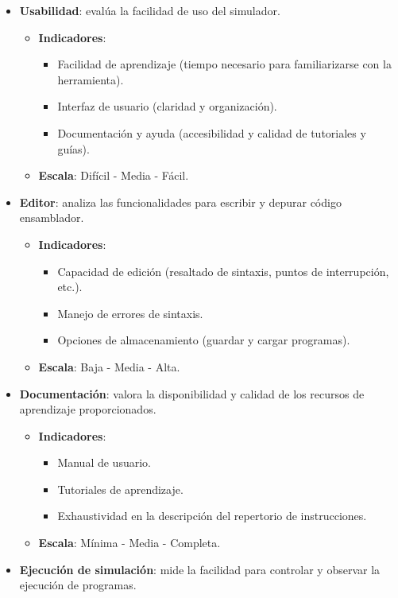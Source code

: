 \documentclass[12pt,oneside]{templates/unerthesis}
\providecommand{\tightlist}{%
  \setlength{\itemsep}{0pt}\setlength{\parskip}{0pt}}
\begin{document}
\begin{itemize}
\tightlist
\item
  \textbf{Usabilidad}: evalúa la facilidad de uso del simulador.

  \begin{itemize}
  \tightlist
  \item
    \textbf{Indicadores}:

    \begin{itemize}
    \tightlist
    \item
      Facilidad de aprendizaje (tiempo necesario para familiarizarse con la herramienta).
    \item
      Interfaz de usuario (claridad y organización).
    \item
      Documentación y ayuda (accesibilidad y calidad de tutoriales y guías).
    \end{itemize}
  \item
    \textbf{Escala}: Difícil - Media - Fácil.
  \end{itemize}
\item
  \textbf{Editor}: analiza las funcionalidades para escribir y depurar código ensamblador.

  \begin{itemize}
  \tightlist
  \item
    \textbf{Indicadores}:

    \begin{itemize}
    \tightlist
    \item
      Capacidad de edición (resaltado de sintaxis, puntos de interrupción, etc.).
    \item
      Manejo de errores de sintaxis.
    \item
      Opciones de almacenamiento (guardar y cargar programas).
    \end{itemize}
  \item
    \textbf{Escala}: Baja - Media - Alta.
  \end{itemize}
\item
  \textbf{Documentación}: valora la disponibilidad y calidad de los recursos de aprendizaje proporcionados.

  \begin{itemize}
  \tightlist
  \item
    \textbf{Indicadores}:

    \begin{itemize}
    \tightlist
    \item
      Manual de usuario.
    \item
      Tutoriales de aprendizaje.
    \item
      Exhaustividad en la descripción del repertorio de instrucciones.
    \end{itemize}
  \item
    \textbf{Escala}: Mínima - Media - Completa.
  \end{itemize}
\item
  \textbf{Ejecución de simulación}: mide la facilidad para controlar y observar la ejecución de programas.


\end{itemize}
\end{document}
